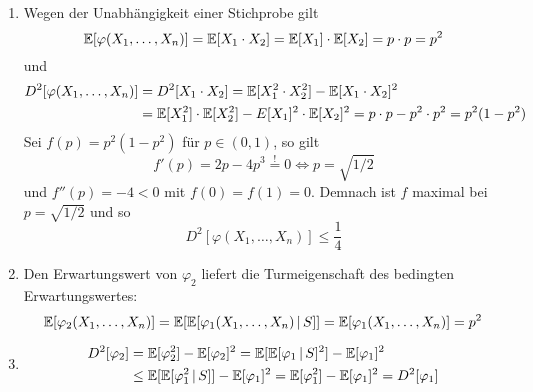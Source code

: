 \begin{loesung}
    \begin{enumerate}
        \item
        Wegen der Unabhängigkeit einer Stichprobe gilt 
        \[
            \mathbb E[\varphi(X_1,\dots,X_n)] 
            = \mathbb E[X_1\cdot X_2] 
            = \mathbb E[X_1]\cdot\mathbb E[X_2] 
            = p\cdot p 
            = p^2
        \]
        und 
        \begin{align*}
            D^2[\varphi(X_1,\dots,X_n)] 
            &= D^2[X_1\cdot X_2] 
            = \mathbb E[X_1^2\cdot X_2^2] - \mathbb E[X_1\cdot X_2]^2  \\
            &= \mathbb E[X_1^2]\cdot\mathbb E[X_2^2] - E[X_1]^2\cdot \mathbb E[X_2]^2 
            = p\cdot p - p^2\cdot p^2 
            = p^2(1-p^2)
        \end{align*}
        Sei $f(p) = p^2(1-p^2)$ für $p\in(0,1)$, so gilt 
        \[
            f'(p) = 2p-4p^3 \stackrel{!}{=} 0 \iff p = \sqrt{1/2}
        \]
        und $f''(p) = -4<0$ mit $f(0)=f(1)=0$. Demnach ist $f$ maximal bei $p=\sqrt{1/2}$ und so
        \[
            D^2[\varphi(X_1,\dots,X_n)] \leq \dfrac{1}{4}
        \]
        \item
        Den Erwartungswert von $\varphi_2$ liefert die Turmeigenschaft des bedingten Erwartungswertes:
        \[
            \mathbb E[\varphi_2(X_1,\dots,X_n)] 
            = \mathbb E[\mathbb E[\varphi_1(X_1,\dots,X_n)\,|\, S]] 
            = \mathbb E[\varphi_1(X_1,\dots,X_n)] = p^2
        \]
        \item 
        \begin{align*}
            D^2[\varphi_2] 
            &= \mathbb E[\varphi_2^2] - \mathbb E[\varphi_2]^2 
            = \mathbb E[\mathbb E[\varphi_1\,|\, S]^2] -  \mathbb E[\varphi_1]^2 \\
            &\leq \mathbb E[\mathbb E[\varphi_1^2\,|\, S]] -  \mathbb E[\varphi_1]^2 
            = \mathbb E[\varphi_1^2] - \mathbb E[\varphi_1]^2
            = D^2[\varphi_1]
        \end{align*}
    \end{enumerate}
\end{loesung}

